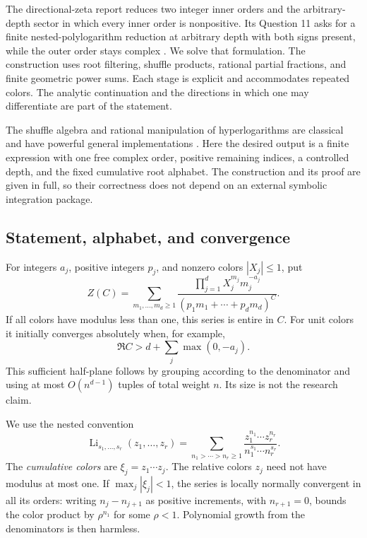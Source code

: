 \documentclass[11pt]{article}
\numberwithin{equation}{section}
\theoremstyle{plain}
\theoremstyle{definition}
\theoremstyle{remark}
\DeclareMathOperator{\Li}{Li}
\begin{document}
The directional-zeta report reduces two integer inner orders and the
arbitrary-depth sector in which every inner order is nonpositive. Its
Question 11 asks for a finite nested-polylogarithm reduction at arbitrary
depth with both signs present, while the outer order stays complex
\cite{RepoDirectional}. We solve that formulation. The construction uses
root filtering, shuffle products, rational partial fractions, and finite
geometric power sums. Each stage is explicit and accommodates repeated
colors. The analytic continuation and the directions in which one may
differentiate are part of the statement.

The shuffle algebra and rational manipulation of hyperlogarithms are
classical and have powerful general implementations \cite{Panzer}.
Here the desired output is a finite expression with one free complex
order, positive remaining indices, a controlled depth, and the fixed
cumulative root alphabet. The construction and its proof are given in
full, so their correctness does not depend on an external symbolic
integration package.

\subsection{Statement, alphabet, and convergence}

For integers $a_j$, positive integers $p_j$, and nonzero colors
$|X_j|\le1$, put
\begin{equation}\label{mixed:Z}
 Z(C)=\sum_{m_1,\ldots,m_d\ge1}
       \frac{\prod_{j=1}^d X_j^{m_j}m_j^{-a_j}}
            {(p_1m_1+\cdots+p_dm_d)^C}.
\end{equation}
If all colors have modulus less than one, this series is entire in
$C$. For unit colors it initially converges absolutely when, for example,
\[
              \Re C>d+\sum_j\max(0,-a_j).
\]
This sufficient half-plane follows by grouping according to the
denominator and using at most $O(n^{d-1})$ tuples of total weight $n$.
Its size is not the research claim.

We use the nested convention
\begin{equation}\label{mixed:Li}
 \Li_{s_1,\ldots,s_r}(z_1,\ldots,z_r)
  =\sum_{n_1>\cdots>n_r\ge1}
            \frac{z_1^{n_1}\cdots z_r^{n_r}}
                 {n_1^{s_1}\cdots n_r^{s_r}}.
\end{equation}
The \emph{cumulative colors} are $\xi_j=z_1\cdots z_j$.
The relative colors $z_j$ need not have modulus at most one.
If $\max_j|\xi_j|<1$, the series is locally normally convergent in
all its orders: writing $n_j-n_{j+1}$ as positive increments, with
$n_{r+1}=0$, bounds the color product by $\rho^{n_1}$ for some
$\rho<1$. Polynomial growth from the denominators is then harmless.
\end{document}
